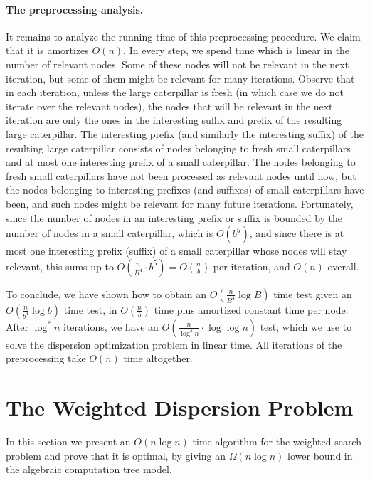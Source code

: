 \documentclass[11pt,a4paper]{article}
\theoremstyle{definition}
\theoremstyle{remark}
\begin{document}
\paragraph{The preprocessing analysis.}
It remains to analyze the running time of this preprocessing procedure. We claim that it is amortizes $O(n)$. 
In every step, we spend time which is linear in the number of relevant nodes. Some of these nodes will not be relevant in the next iteration, but some of them might be relevant for many iterations. Observe that in each iteration, unless the large caterpillar is fresh (in which case we do not iterate over the relevant nodes), the nodes that will be relevant in the next iteration are only the ones in the interesting suffix and prefix of the resulting large caterpillar. The interesting prefix (and similarly the interesting suffix) of the resulting large caterpillar
consists of nodes belonging to fresh small caterpillars and at most one interesting prefix of
a small caterpillar. The nodes belonging to fresh small caterpillars have not been processed as relevant nodes until now, but the nodes belonging to interesting prefixes (and suffixes) of small caterpillars have been, and such nodes might be relevant for many future iterations. Fortunately, since the number of nodes in an interesting prefix or suffix is bounded by the number of nodes in a small caterpillar, which is $O(b^{5})$, and since there is at most one interesting prefix (suffix) of a small caterpillar whose nodes will stay relevant, this sums up to $O(\frac{n}{B^{4}}\cdot b^{5}) = O(\frac{n}{b})$ per iteration, and $O(n)$ overall.

To conclude, we have shown how to obtain an $O(\frac{n}{B^{4}}\log B)$ time test given an $O(\frac{n}{b^{4}}\log b)$
time test, in $O(\frac{n}{b})$ time plus amortized constant time per
node. After $\log^*n$ iterations, we have an  $O(\frac{n}{\log ^4n} \cdot \log \log n)$ test,
which we use to solve the dispersion optimization problem in linear time. All iterations of the preprocessing
take $O(n)$ time altogether.

\section{The Weighted Dispersion Problem}\label{section:weighted}



In this section we present an $O(n\log n)$ time algorithm for the weighted search problem and prove that it is optimal, by giving an 
$\Omega(n \log n)$ lower bound in the algebraic computation tree model.
\end{document}
